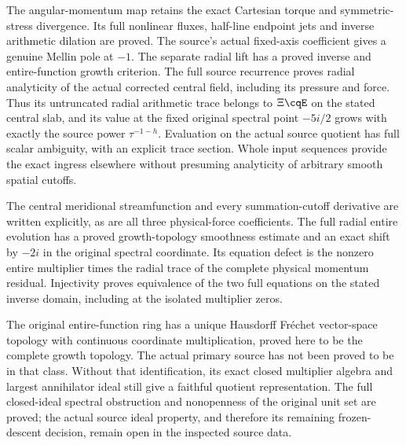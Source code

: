 The angular-momentum map retains the exact Cartesian torque and
symmetric-stress divergence. Its full nonlinear fluxes, half-line
endpoint jets and inverse arithmetic dilation are proved.
The source's actual fixed-axis coefficient gives a genuine Mellin
pole at $-1$. The separate radial lift has a proved inverse and
entire-function growth criterion. The full source recurrence proves
radial analyticity of the actual corrected central field, including
its pressure and force. Thus its untruncated radial arithmetic trace
belongs to $\Xi\cqE$ on the stated central slab, and its value at the
fixed original spectral point $-5i/2$ grows with exactly the source
power $\tau^{-1-h}$. Evaluation on the actual source quotient has
full scalar ambiguity, with an explicit trace section. Whole input
sequences provide the exact ingress elsewhere without presuming
analyticity of arbitrary smooth spatial cutoffs.


The central meridional streamfunction and every summation-cutoff
derivative are written explicitly, as are all three physical-force
coefficients. The full radial entire evolution has a proved
growth-topology smoothness estimate and an exact shift by $-2i$
in the original spectral coordinate. Its equation defect is the
nonzero entire multiplier times the radial trace of the complete
physical momentum residual. Injectivity proves equivalence of
the two full equations on the stated inverse domain, including
at the isolated multiplier zeros.

The original entire-function ring has a unique Hausdorff Fr\'echet
vector-space topology with continuous coordinate multiplication,
proved here to be the complete growth topology. The actual primary
source has not been proved to be in that class. Without that
identification, its exact closed multiplier algebra and largest
annihilator ideal still give a faithful quotient representation.
The full closed-ideal spectral obstruction and nonopenness of the
original unit set are proved; the actual source ideal property,
and therefore its remaining frozen-descent decision, remain open
in the inspected source data.

